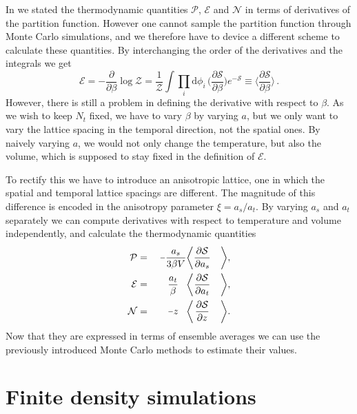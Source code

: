 In  we stated the thermodynamic quantities $\mathcal{P}$,
$\mathcal{E}$ and $\mathcal{N}$ in terms of derivatives of the partition
function. However one cannot sample the partition function through Monte Carlo
simulations, and we therefore have to device a different scheme to calculate
these quantities. By interchanging the order of the derivatives and the
integrals we get 
%
\begin{equation}
  \mathcal{E} = \minus\frac{\partial}{\partial \beta} \log \mathcal{Z}
    = \frac{1}{\mathcal{Z}} \int \prod_i \mathrm{d} \phi_i \, 
    \bigg( \frac{\partial\mathcal{S}}{\partial \beta} \bigg) e^{-\mathcal{S}}
    \equiv \bigg\langle \frac{\partial\mathcal{S}}{\partial \beta} \bigg\rangle
    \,.
\end{equation}
%
However, there is still a problem in defining the derivative with respect to
$\beta$. As we wish to keep $N_t$ fixed, we have to vary $\beta$ by varying $a$,
but we only want to vary the lattice spacing in the temporal direction, not the
spatial ones. By naively varying $a$, we would not only change the temperature,
but also the volume, which is supposed to stay fixed in the definition of
$\mathcal{E}$.

To rectify this we have to introduce an anisotropic lattice, one in which the
spatial and temporal lattice spacings are different. The magnitude of this
difference is encoded in the anisotropy parameter $\xi = a_s / a_t$. By varying
$a_s$ and $a_t$ separately we can compute derivatives with respect to
temperature and volume independently, and calculate the thermodynamic quantities
%
\begin{alignat}{99}
  \mathcal{P} &{}={}& \centermathcell{\minus\frac{a_s}{3 \beta V}} \bigg\langle &
    \centermathcell{\frac{\partial \mathcal{S}}{\partial a_s}} &\bigg\rangle, \\
  \mathcal{E} &{}={}& \centermathcell{\frac{a_t}{\beta}} \bigg\langle &
    \centermathcell{\frac{\partial \mathcal{S}}{\partial a_t}} &\bigg\rangle, \\
  \mathcal{N} &{}={}& \centermathcell{\minus{}z} \bigg\langle & 
    \centermathcell{\frac{\partial \mathcal{S}}{\partial z}} &\bigg\rangle.
\end{alignat}
%
Now that they are expressed in terms of ensemble averages we can use the
previously introduced Monte Carlo methods to estimate their values.

\section{Finite density simulations} \label{sec:finite-density-lattice}

